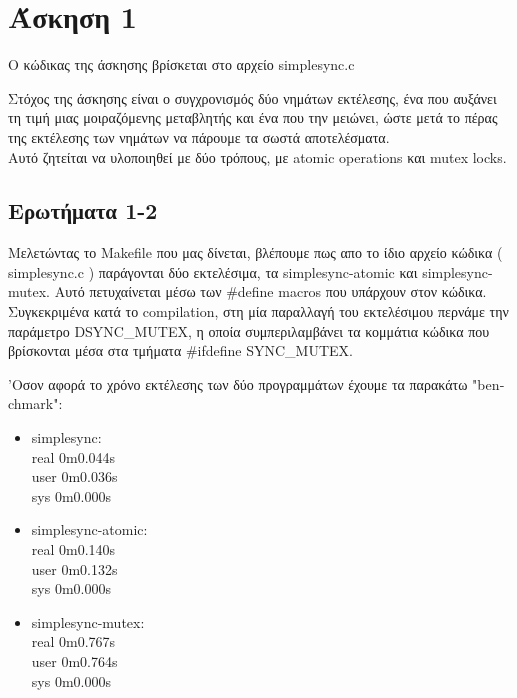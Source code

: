 \documentclass[12pt]{article}
\begin{document}
\section*{Άσκηση 1}
Ο κώδικας της άσκησης βρίσκεται στο αρχείο \textlatin{simplesync.c}

Στόχος της άσκησης είναι ο συγχρονισμός δύο νημάτων εκτέλεσης, ένα που αυξάνει τη τιμή μιας μοιραζόμενης μεταβλητής και ένα που την μειώνει, ώστε μετά το πέρας της εκτέλεσης των νημάτων να πάρουμε τα σωστά αποτελέσματα. \\
Αυτό ζητείται να υλοποιηθεί με δύο τρόπους, με \textlatin{atomic operations} και \textlatin{mutex locks}. 

\subsection*{Ερωτήματα 1-2}Μελετώντας το \textlatin{Makefile} που μας δίνεται, βλέπουμε πως απο το ίδιο αρχείο κώδικα ( \textlatin{simplesync.c} ) παράγονται δύο εκτελέσιμα, τα \textlatin{simplesync-atomic} και \textlatin{simplesync-mutex}.  
Αυτό πετυχαίνεται μέσω των \textlatin{\#define macros} που υπάρχουν στον κώδικα.
 Συγκεκριμένα κατά το \textlatin{compilation}, στη μία παραλλαγή του εκτελέσιμου περνάμε την παράμετρο \textlatin{DSYNC\_MUTEX}, η οποία συμπεριλαμβάνει τα κομμάτια κώδικα που βρίσκονται μέσα στα τμήματα \textlatin{\#ifdefine SYNC\_MUTEX}.
 
'Οσον αφορά το χρόνο εκτέλεσης των δύο προγραμμάτων έχουμε τα παρακάτω \textlatin{"benchmark"}:

\begin{itemize}

\item \textlatin{simplesync}: \\
\textlatin{
real	0m0.044s    \\
user	0m0.036s    \\
sys	0m0.000s    \\
}

\item \textlatin{simplesync-atomic}:  \\
\textlatin{
real	0m0.140s \\
user	0m0.132s \\
sys	0m0.000s \\
}
								
\item \textlatin{simplesync-mutex}:  \\
\textlatin{
real	0m0.767s \\
user	0m0.764s \\
sys	0m0.000s \\
}

\end{itemize}
\end{document}

